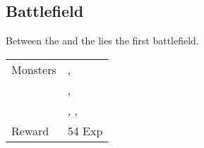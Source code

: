 \subsection{Battlefield}
\label{map:battlefield_01}

Between the  and the  lies the first battlefield. 

\noindent\begin{tabularx}{\textwidth}[l]{lX}
	Monsters
	& \nameref{monster:mad_plant}, \nameref{monster:poison_toad} \\
	& \nameref{monster:mad_plant}, \nameref{monster:mad_plant} \\
	& \nameref{monster:mad_plant}, \nameref{monster:mad_plant}, \nameref{monster:mad_plant}
\\ \hline
	Reward & 54 Exp
\end{tabularx}
